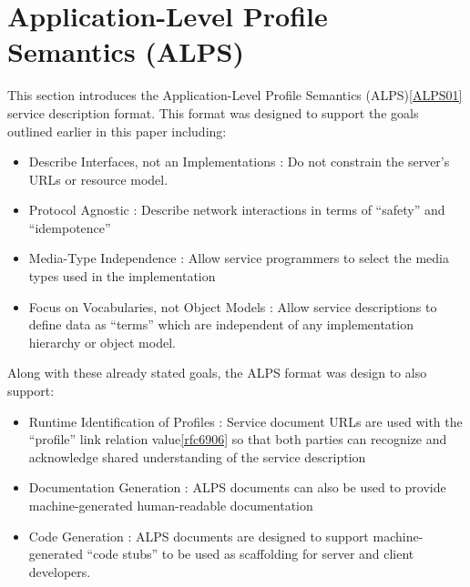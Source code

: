 \documentclass{wsrest2014}
\begin{document}
\section{Application-Level Profile\\Semantics (ALPS)}
\label{_application_level_profile_semantics_alps}
 \par{}This section introduces the Application-Level Profile Semantics (ALPS)\hyperlink{ALPS01}{[ALPS01]} service description format. This format was designed to support the goals outlined earlier in this paper including:
\begin{itemize}

\item%
Describe Interfaces, not an Implementations :
   Do not constrain the server's URLs or resource model.

\item%
Protocol Agnostic :
   Describe network interactions in terms of ``safety'' and ``idempotence''

\item%
Media-Type Independence :
   Allow service programmers to select the media types used in the implementation

\item%
Focus on Vocabularies, not Object Models :
   Allow service descriptions to define data as ``terms'' which are independent of any implementation hierarchy or object model.
\end{itemize}

 \par{}Along with these already stated goals, the ALPS format was design to also support:

\begin{itemize}

\item%
Runtime Identification of Profiles :
    Service document URLs are used with the ``profile'' link relation value\hyperlink{rfc6906}{[rfc6906]} so that both parties can recognize and acknowledge shared understanding of the service description

\item%
Documentation Generation :
    ALPS documents can also be used to provide machine-generated human-readable documentation

\item%
Code Generation :
    ALPS documents are designed to support machine-generated ``code stubs'' to be used as scaffolding for server and client developers.

\end{itemize}
\end{document}
